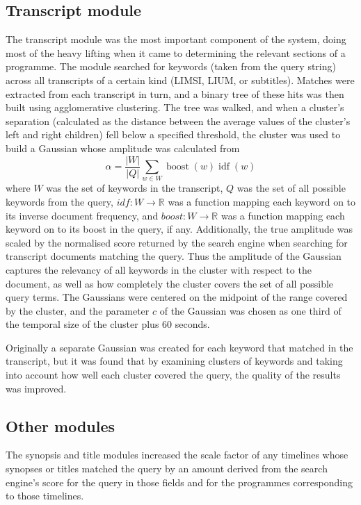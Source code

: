 \documentclass{../acm_proc_article-me11_tweaked}
\begin{document}
\subsection{Transcript module}
The transcript module was the most important component of the system, doing 
most of the heavy lifting when it came to determining the relevant sections 
of a programme. The module searched for keywords (taken from the query string) 
across all transcripts of a certain kind (LIMSI, LIUM, or subtitles). Matches 
were extracted from each transcript in turn, and a binary tree of these hits 
was then built using agglomerative clustering. The tree was walked, and when 
a cluster's separation (calculated as the distance between the average values 
of the cluster's left and right children) fell below a specified threshold, 
the cluster was used to build a Gaussian whose amplitude was calculated from 
\[\alpha = \frac{| W |}{| Q |} \sum_{w \in W} \operatorname{boost}(w) \operatorname{idf}(w)\]
where \(W\) was the set of keywords in the transcript, \(Q\) was the set of 
all possible keywords from the query, \(idf : W \to \mathbb{R}\) was a 
function mapping each keyword on to its inverse document frequency, and 
\(boost : W \to \mathbb{R}\) was a function mapping each keyword on to its 
boost in the query, if any. Additionally, the true amplitude was scaled by the 
normalised score returned by the search engine when searching for transcript 
documents matching the query. Thus the amplitude of the Gaussian captures the 
relevancy of all keywords in the cluster with respect to the document, as well 
as how completely the cluster covers the set of all possible query terms. The 
Gaussians were centered on the midpoint of the range covered by the cluster, 
and the parameter \(c\) of the Gaussian was chosen as one third of the 
temporal size of the cluster plus 60 seconds.

Originally a separate Gaussian was created for each keyword that matched in 
the transcript, but it was found that by examining clusters of keywords and 
taking into account how well each cluster covered the query, the quality of 
the results was improved.

\subsection{Other modules}
The synopsis and title modules increased the scale factor of any timelines 
whose synopses or titles matched the query by an amount derived from the 
search engine's score for the query in those fields and for the programmes 
corresponding to those timelines.
\end{document}
